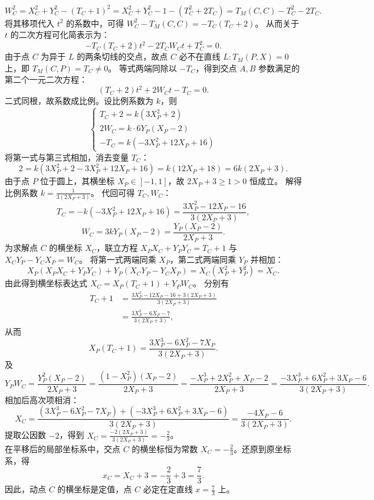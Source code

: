 \begin{solution}
\[ W_C^2 = X_C^2 + Y_C^2 - (T_C + 1)^2 = X_C^2 + Y_C^2 - 1 - (T_C^2 + 2T_C) = T_M(C,C) - T_C^2 - 2T_C. \]
将其移项代入 $t^2$ 的系数中，可得 $W_C^2 - T_M(C,C) = -T_C(T_C + 2)$。
从而关于 $t$ 的二次方程可化简表示为：
\[ -T_C(T_C + 2)t^2 - 2T_C W_C t + T_C^2 = 0. \]
由于点 $C$ 为异于 $L$ 的两条切线的交点，故点 $C$ 必不在直线 $L: T_M(P,X) = 0$ 上，即 $T_M(C,P) = T_C \neq 0$。
等式两端同除以 $-T_C$，得到交点 $A, B$ 参数满足的第二个一元二次方程：
\[ (T_C + 2)t^2 + 2 W_C t - T_C = 0. \]
二式同根，故系数成比例。设比例系数为 $k$，则
\[ \begin{cases} T_C + 2 = k(3X_P^2 + 2) \\ 2W_C = k \cdot 6Y_P(X_P - 2) \\ -T_C = k(-3X_P^2 + 12X_P + 16) \end{cases} \]
将第一式与第三式相加，消去变量 $T_C$：
\[ 2 = k(3X_P^2 + 2 - 3X_P^2 + 12X_P + 16) = k(12X_P + 18) = 6k(2X_P + 3). \]
由于点 $P$ 位于圆上，其横坐标 $X_P \in [-1, 1]$，故 $2X_P + 3 \ge 1 > 0$ 恒成立。
解得比例系数 $k = \frac{1}{3(2X_P + 3)}$。
代回可得 $T_C,W_C$：
\[ T_C = -k(-3X_P^2 + 12X_P + 16) = \frac{3X_P^2 - 12X_P - 16}{3(2X_P + 3)}, \]
\[ W_C = 3k Y_P(X_P - 2) = \frac{Y_P(X_P - 2)}{2X_P + 3}. \]
为求解点 $C$ 的横坐标 $X_C$，联立方程 $X_P X_C + Y_P Y_C = T_C + 1$ 与 $X_C Y_P - Y_C X_P = W_C$。
将第一式两端同乘 $X_P$，第二式两端同乘 $Y_P$ 并相加：
\[ X_P(X_P X_C + Y_P Y_C) + Y_P(X_C Y_P - Y_C X_P) = X_C(X_P^2 + Y_P^2) = X_C. \]
由此得到横坐标表达式 $X_C = X_P(T_C + 1) + Y_P W_C$。
分别有
\[
\begin{aligned}
T_C + 1
&= \frac{3X_P^2 - 12X_P - 16 + 3(2X_P + 3)}{3(2X_P + 3)} \\
&= \frac{3X_P^2 - 6X_P - 7}{3(2X_P + 3)},
\end{aligned}
\]
从而
\[
X_P(T_C + 1) = \frac{3X_P^3 - 6X_P^2 - 7X_P}{3(2X_P + 3)}.
\]
及
\[
Y_P W_C = \frac{Y_P^2(X_P - 2)}{2X_P + 3} = \frac{(1 - X_P^2)(X_P - 2)}{2X_P + 3} = \frac{-X_P^3 + 2X_P^2 + X_P - 2}{2X_P + 3} = \frac{-3X_P^3 + 6X_P^2 + 3X_P - 6}{3(2X_P + 3)}.
\]
相加后高次项相消：
\[ X_C = \frac{(3X_P^3 - 6X_P^2 - 7X_P) + (-3X_P^3 + 6X_P^2 + 3X_P - 6)}{3(2X_P + 3)} = \frac{-4X_P - 6}{3(2X_P + 3)}. \]
提取公因数 $-2$，得到 $X_C = \frac{-2(2X_P + 3)}{3(2X_P + 3)} = -\frac{2}{3}$。\\
在平移后的局部坐标系中，交点 $C$ 的横坐标恒为常数 $X_C = -\frac{2}{3}$。还原到原坐标系，得
\[ x_C = X_C + 3 = -\frac{2}{3} + 3 = \frac{7}{3}. \]
因此，动点 $C$ 的横坐标是定值，点 $C$ 必定在定直线 $x = \frac{7}{3}$ 上。
\end{solution}


